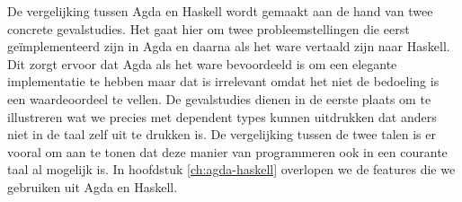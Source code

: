 De vergelijking tussen Agda en Haskell wordt gemaakt aan de hand van twee
concrete gevalstudies. Het gaat hier om twee probleemstellingen die eerst
geïmplementeerd zijn in Agda en daarna als het ware vertaald zijn naar Haskell.
Dit zorgt ervoor dat Agda als het ware bevoordeeld is om een elegante
implementatie te hebben maar dat is irrelevant omdat het niet de bedoeling is
een waardeoordeel te vellen. De gevalstudies dienen in de eerste plaats om te
illustreren wat we precies met dependent types kunnen uitdrukken dat anders
niet in de taal zelf uit te drukken is. De vergelijking tussen de twee talen is
er vooral om aan te tonen dat deze manier van programmeren ook in een courante
taal al mogelijk is. In hoofdstuk \ref{ch:agda-haskell} overlopen we de
features die we gebruiken uit Agda en Haskell.

